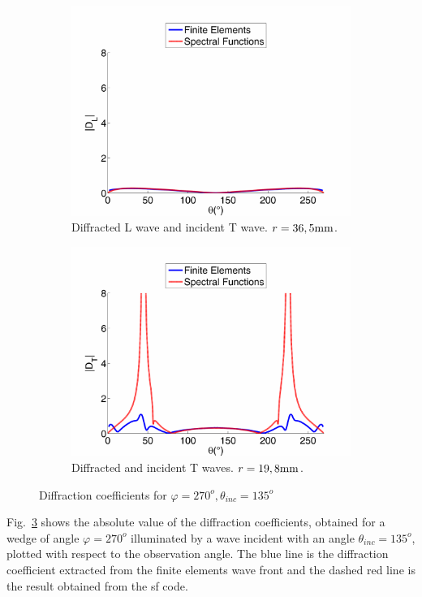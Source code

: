 \begin{figure}
\begin{subfigure}[b]{0.44\textwidth}
        \includegraphics[width=\textwidth]{images/chapter3/Figure11c.pdf}
        \caption{Diffracted L wave and incident T wave. $r=36,5 \rm mm$.}
        \label{DTL}
    \end{subfigure}
    \begin{subfigure}[b]{0.44\textwidth}
        \includegraphics[width=\textwidth]{images/chapter3/Figure11d.pdf}
        \caption{Diffracted and incident T waves. $r=19,8 \rm mm$.}
        \label{DTT}
     \end{subfigure}
     \caption{Diffraction coefficients for $\varphi=270^o, \theta_{inc}=135^o$}
     \label{270135}
\end{figure}

Fig.~\ref{270135} shows the absolute value of the diffraction coefficients, obtained for a wedge of angle $\varphi=270^o$ illuminated by a wave incident with an angle $\theta_{inc}=135^o$, plotted with respect to the observation angle. The blue line is the diffraction coefficient extracted from the finite elements wave front and the dashed red line is the result obtained from the \acrshort{sf} code. 

